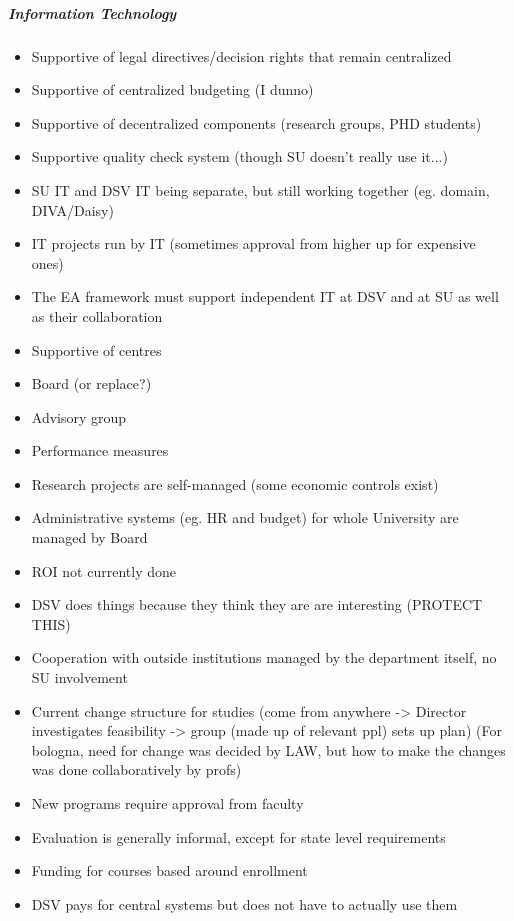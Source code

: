 \subparagraph*{Information Technology}
\begin{itemize}


\item Supportive of legal directives/decision rights that remain centralized

\item Supportive of centralized budgeting (I dunno)

\item Supportive of decentralized components (research groups, PHD students)
 

\item Supportive quality check system (though SU doesn't really use it...)

 
\item SU IT and DSV IT being separate, but still working together (eg. domain, DIVA/Daisy)

\item IT projects run by IT (sometimes approval from higher up for expensive ones)

\item The EA framework must support independent IT at DSV and at SU as well as their collaboration

\item Supportive of centres

\item Board (or replace?)

\item Advisory group

\item Performance measures

\item Research projects are self-managed (some economic controls exist)

\item Administrative systems (eg. HR and budget) for whole University are managed by Board

\item ROI not currently done

\item DSV does things because they think they are are interesting (PROTECT THIS)

\item Cooperation with outside institutions managed by the department  itself, no SU involvement

\item Current change structure for studies (come from anywhere -> Director investigates feasibility -> group (made up of relevant ppl) sets up plan) (For bologna, need for change was decided by LAW, but how to make the changes was done collaboratively by profs)

\item New programs require approval from faculty

\item Evaluation is generally informal, except for state level requirements

\item Funding for courses based around enrollment 

\item DSV pays for central systems but does not have to actually use them

\end{itemize}
